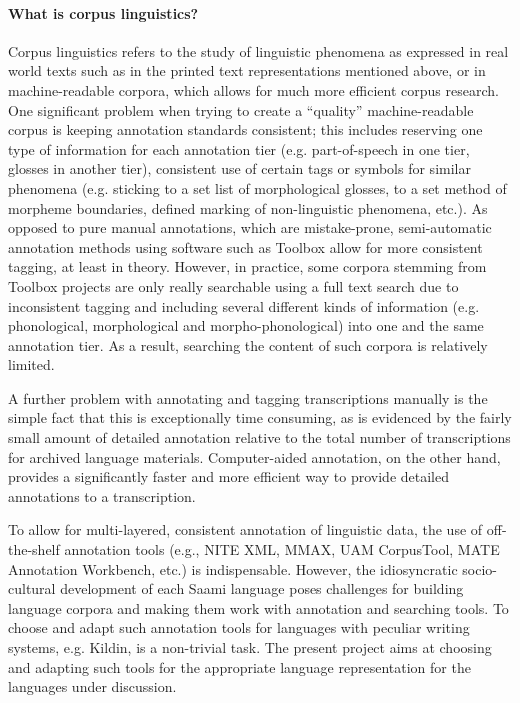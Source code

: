 \documentclass[a4paper,12pt]{article}
\begin{document}
\paragraph{What is corpus linguistics?} Corpus linguistics refers to the study of linguistic phenomena as expressed in real world texts such as in the printed text representations mentioned above, or in machine-readable corpora, which allows for much more efficient corpus research. One significant problem when trying to create a “quality” machine-readable corpus is keeping annotation standards consistent; this includes reserving one type of information for each annotation tier (e.g. part-of-speech in one tier, glosses in another tier), consistent use of certain tags or symbols for similar phenomena (e.g. sticking to a set list of morphological glosses, to a set method of morpheme boundaries, defined marking of non-linguistic phenomena, etc.). As opposed to pure manual annotations, which are mistake-prone, semi-automatic annotation methods using software such as Toolbox allow for more consistent tagging, at least in theory. However, in practice, some corpora stemming from Toolbox projects are only really searchable using a full text search due to inconsistent tagging and including several different kinds of information (e.g. phonological, morphological and morpho-phonological) into one and the same annotation tier. As a result, searching the content of such corpora is relatively limited.

A further problem with annotating and tagging transcriptions manually is the simple fact that this is exceptionally time consuming, as is evidenced by the fairly small amount of detailed annotation relative to the total number of transcriptions for archived language materials. %
Computer-aided annotation, on the other hand, provides a significantly faster and more efficient way to provide detailed annotations to a transcription.

To allow for multi-layered, consistent annotation of linguistic data, the use of off-the-shelf annotation tools (e.g., NITE XML, MMAX, UAM CorpusTool, MATE Annotation Workbench, etc.) %
is indispensable. However, the idiosyncratic socio-cultural development of each Saami language poses challenges for building language corpora and making them work with annotation and searching tools. To choose and adapt such annotation tools for languages with peculiar writing systems, e.g. Kildin, is a non-trivial task. The present project aims at choosing and adapting such tools for the appropriate language representation for the languages under discussion. %
\end{document}
